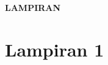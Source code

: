 \newpage %
\singlespacing
\begin{center}
\begin{large}\textbf{LAMPIRAN}\\\end{large}
\end{center}
\vspace{5mm}

\section*{Lampiran 1}
\begin{center}

\end{center}